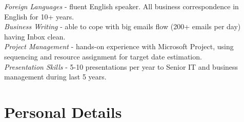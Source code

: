 \documentclass[10pt]{article} %
\begin{document}

{
\textit{Foreign Languages} - fluent English speaker. All business correspondence in English for 10+ years.\\
\textit{Business Writing} - able to cope with big emails flow (200+ emails per day) having Inbox clean. \\
\textit{Project Management} - hands-on experience with Microsoft Project, using sequencing and resource assignment for target date estimation.\\
\textit{Presentation Skills} - 5-10 presentations per year to Senior IT and business management during last 5 years.
}


\section{Personal Details}

\end{document}
